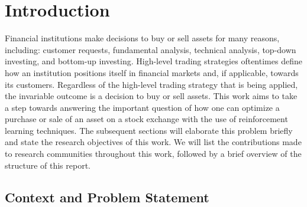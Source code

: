 \chapter{Introduction}
\label{chap:introduction}

Financial institutions make decisions to buy or sell assets for many reasons, including: customer requests, fundamental analysis\cite{fundamental-analysis}, technical analysis\cite{technical-analysis}, top-down investing\cite{td-investing}, and bottom-up investing\cite{bu-investing}.
High-level trading strategies oftentimes define how an institution positions itself in financial markets and, if applicable, towards its customers.
Regardless of the high-level trading strategy that is being applied, the invariable outcome is a decision to buy or sell assets.
This work aims to take a step towards answering the important question of how one can optimize a purchase or sale of an asset on a stock exchange with the use of reinforcement learning techniques.
The subsequent sections will elaborate this problem briefly and state the research objectives of this work.
We will list the contributions made to research communities throughout this work, followed by a brief overview of the structure of this report.

\section{Context and Problem Statement}
\label{sec:problem-statement}

